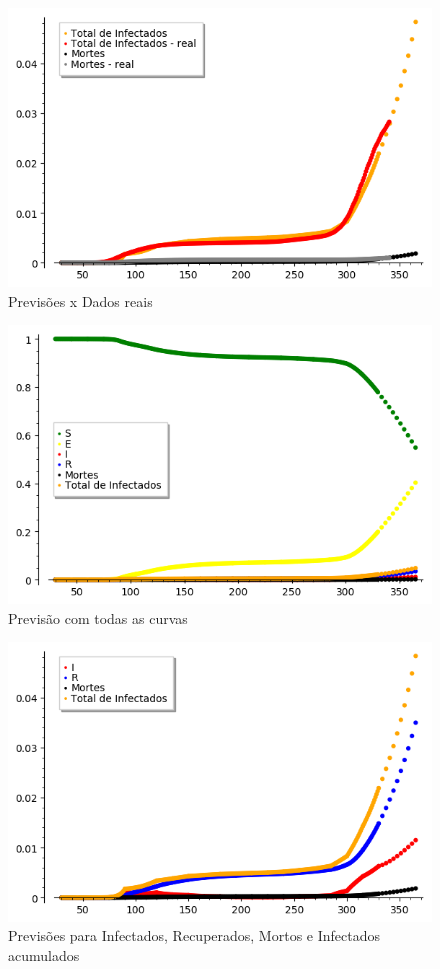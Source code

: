 \documentclass{article}
\begin{document}
\begin{figure}[H]
    \centering
    \includegraphics[scale = 0.7]{Imagens/DTDrTrp.png}
    \caption{Previsões x Dados reais}
    \label{fitp}
\end{figure}

\begin{figure}[H]
    \centering
    \includegraphics[scale = 0.7]{Imagens/SEIRDTp.png}
    \caption{Previsão com todas as curvas}
    \label{resultadosp}
\end{figure}

\begin{figure}[H]
    \centering
    \includegraphics[scale = 0.7]{Imagens/IRDTp.png}
    \caption{Previsões para Infectados, Recuperados, Mortos e Infectados acumulados}
    \label{IRDTp}
\end{figure}
\end{document}
